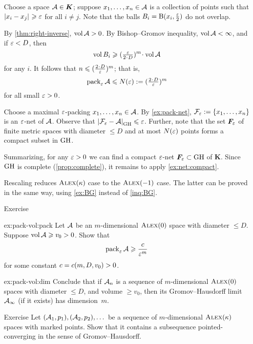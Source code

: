 Choose a space $\spc{A}\in \bm{K}$;
suppose $x_1,\dots,x_n\in \spc{A}$ is a collection of points such that $\dist{x_i}{x_j}{}\ge \eps$ for all $i\ne j$.
Note that the balls $B_i=\oBall(x_i,\tfrac\eps2)$ do not overlap.

By \ref{thm:right-inverse}, $\vol \spc{A}>0$.
By Bishop--Gromov inequality, $\vol \spc{A}<\infty$,
and if $\eps<D$, then 
\[\vol B_i\ge (\tfrac\eps{2\cdot D})^m\cdot\vol \spc{A}\]
for any $i$.
It follows that $n\le (\tfrac{2\cdot D}\eps)^m$;
that is, 
\[\pack_\eps\spc{A}\le  N(\eps)\df(\tfrac{2\cdot D}\eps)^m\]
for all small $\eps>0$.

Choose a maximal $\eps$-packing $x_1,\z\dots,x_n\in \spc{A}$.
By \ref{ex:pack-net}, $\spc{F}_\eps\z\df\{x_1,\z\dots,x_n\}$ is an $\eps$-net of $\spc{A}$.
Observe that $\dist{\spc{F}_\eps}{\spc{A}}{\GH}\le \eps$.
Further, note that the set $\bm{F}_\eps$ of finite metric spaces with diameter $\le D$ and at most $N(\eps)$ points forms a compact subset in $\GH$.

Summarizing, for any $\eps>0$ we can find a compact $\eps$-net $\bm{F}_\eps\subset \GH$ of $\bm{K}$.
Since $\GH$ is complete (\ref{prop:complete}), it remains to apply \ref{ex:net:compact}.

Rescaling reduces $\Alex\kappa$ case to the $\Alex{-1}$ case.
The latter can be proved in the same way, using \ref{ex:BG} instead of \ref{inq:BG}.
\qeds

\begin{thm}{Exercise}\label{ex:pack-vol}

\begin{subthm}{ex:pack-vol:pack}
Let $\spc{A}$ be an $m$-dimensional $\Alex0$ space with diameter $\le D$.
Suppose $\vol\spc{A}\ge v_0>0$.
Show that 
\[\pack_\eps\spc{A}\ge \frac\Const{\eps^m}\]
for some constant $\Const=\Const(m,D,v_0)>0$.
\end{subthm}


\begin{subthm}{ex:pack-vol:dim}
Conclude that if $\spc{A}_n$ is a sequence of $m$-dimensional $\Alex0$ spaces with diameter $\le D$, and volume $\ge v_0$, then its Gromov--Hausdorff limit $\spc{A}_\infty$ (if it exists) has dimension~$m$.
\end{subthm}
\end{thm}

\begin{thm}{Exercise}\label{ex:diam-compact:GH}
Let $(\spc{A}_1,p_1),(\spc{A}_2,p_2),\dots$ be a sequence of $m$-dimensional $\Alex\kappa$ spaces with marked points.
Show that it contains a subsequence pointed-converging in the sense of Gromov--Hausdorff.

\end{thm}
